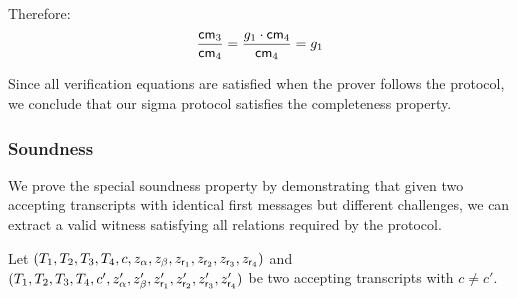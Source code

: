 \begin{enumerate}
    Therefore:
    \begin{align*}
        \frac{\mathsf{cm}_3}{\mathsf{cm}_4} = \frac{g_1 \cdot \mathsf{cm}_4}{\mathsf{cm}_4} = g_1
    \end{align*}
\end{enumerate}

Since all verification equations are satisfied when the prover follows the protocol, we conclude that our sigma protocol satisfies the completeness property.


\subsubsection*{Soundness}
We prove the special soundness property by demonstrating that given two accepting transcripts with identical first messages but different challenges, we can extract a valid witness satisfying all relations required by the protocol.

Let $(T_1, T_2, T_3, T_4, c, z_\alpha, z_\beta, z_{\mathsf{r}_1}, z_{\mathsf{r}_2}, z_{\mathsf{r}_3}, z_{\mathsf{r}_4})$ and $(T_1, T_2, T_3, T_4, c', z'_\alpha, z'_\beta, z'_{\mathsf{r}_1}, z'_{\mathsf{r}_2}, z'_{\mathsf{r}_3}, z'_{\mathsf{r}_4})$ be two accepting transcripts with $c \neq c'$.

